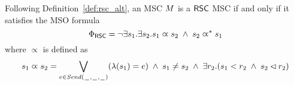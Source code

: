 Following Definition~\ref{def:rsc_alt}, an MSC $M$ is a $\mathsf{RSC}$ MSC if and only if it satisfies the MSO formula
\[
\Phi_{\mathsf{RSC}} = \neg \exists s_1.\exists s_2. s_1 \varpropto s_2 \;\wedge\; s_2 \varpropto^\ast s_1
\]
\noindent where $\varpropto$ is defined as
\[
s_1 \varpropto s_2 = 
\bigvee_{\substack{e \in {\mathit{Send}(\hspace{0.1em}\underline{\hspace{0.5em}}\hspace{0.1em},\hspace{0.1em}\underline{\hspace{0.5em}}\hspace{0.1em},\hspace{0.1em}\underline{\hspace{0.5em}}\hspace{0.1em})}}}(\lambda(s_1) = e) \;\wedge\;
s_1 \neq s_2 \;\wedge\; 
\exists r_2. (s_1 < r_2 \;\wedge\; s_2 \lhd r_2)
\]

